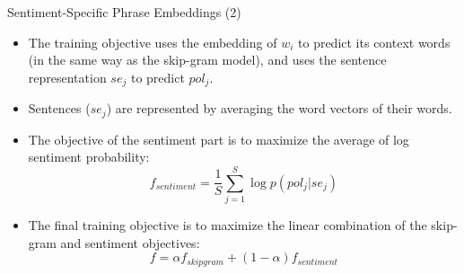 \begin{frame}{Sentiment-Specific Phrase Embeddings (2)}
\begin{scriptsize}
\begin{itemize}

\item The training objective uses the embedding of $w_i$ to predict its context words (in the same way as the skip-gram model), and uses the sentence representation $se_j$ to predict $pol_j$.


\item Sentences ($se_j$) are represented by averaging the word vectors of their words.

\item The  objective of the sentiment part is to maximize the average of log sentiment probability: 
\begin{displaymath}
f_{sentiment}= \frac{1}{S}\sum_{j=1}^{S}\log p(pol_j|se_j)
\end{displaymath}

\item The final training objective is to maximize the linear combination of the skip-gram and sentiment objectives: 
\begin{displaymath}
f = \alpha f_{skipgram} + (1- \alpha)f_{sentiment}
\end{displaymath}

\end{itemize}
\end{scriptsize}
\end{frame}



